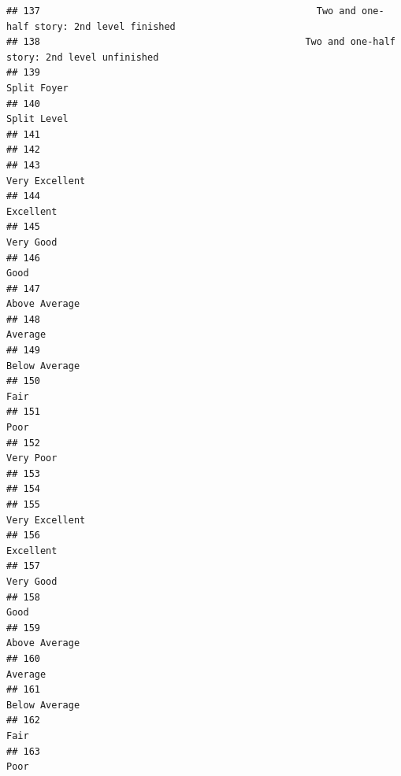 \documentclass[
]{article}
\begin{document}
\begin{verbatim}
## 137                                                 Two and one-half story: 2nd level finished
## 138                                               Two and one-half story: 2nd level unfinished
## 139                                                                                Split Foyer
## 140                                                                                Split Level
## 141                                                                                           
## 142                                                                                           
## 143                                                                             Very Excellent
## 144                                                                                  Excellent
## 145                                                                                  Very Good
## 146                                                                                       Good
## 147                                                                              Above Average
## 148                                                                                    Average
## 149                                                                              Below Average
## 150                                                                                       Fair
## 151                                                                                       Poor
## 152                                                                                  Very Poor
## 153                                                                                           
## 154                                                                                           
## 155                                                                             Very Excellent
## 156                                                                                  Excellent
## 157                                                                                  Very Good
## 158                                                                                       Good
## 159                                                                              Above Average
## 160                                                                                    Average
## 161                                                                              Below Average
## 162                                                                                       Fair
## 163                                                                                       Poor

\end{verbatim}
\end{document}
